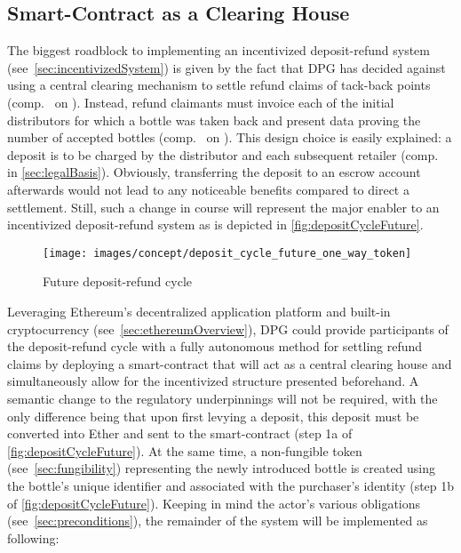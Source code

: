 \subsection{Smart-Contract as a Clearing House}
The biggest roadblock to implementing an incentivized deposit-refund system (see~\ref{sec:incentivizedSystem}) is given by the fact that \ac{DPG} has decided against using a central clearing mechanism to settle refund claims of tack-back points (comp.~ on ). Instead, refund claimants must invoice each of the initial distributors for which a bottle was taken back and present data proving the number of accepted bottles (comp.~ on ). This design choice is easily explained: a deposit is to be charged by the distributor and each subsequent retailer (comp.~ in \ref{sec:legalBasis}). Obviously, transferring the deposit to an escrow account afterwards would not lead to any noticeable benefits compared to direct a settlement. Still, such a change in course will represent the major enabler to an incentivized deposit-refund system as is depicted in \autoref{fig:depositCycleFuture}.

\begin{figure}[hbt]
	  \texttt{[image: images/concept/deposit\_cycle\_future\_one\_way\_token]}
	  \caption[Future deposit-refund cycle]{Future deposit-refund cycle \footnotemark}
	  \label{fig:depositCycleFuture}
\end{figure}


\FloatBarrier

Leveraging Ethereum's decentralized application platform and built-in cryptocurrency (see~\ref{sec:ethereumOverview}), \ac{DPG} could provide participants of the deposit-refund cycle with a fully autonomous method for settling refund claims by deploying a smart-contract that will act as a central clearing house and simultaneously allow for the incentivized structure presented beforehand. A semantic change to the regulatory underpinnings will not be required, with the only difference being that upon first levying a deposit, this deposit must be converted into Ether and sent to the smart-contract (step 1a of \autoref{fig:depositCycleFuture}). At the same time, a non-fungible token (see~\ref{sec:fungibility}) representing the newly introduced bottle is created using the bottle's unique identifier and associated with the purchaser's identity (step 1b of \autoref{fig:depositCycleFuture}). Keeping in mind the actor's various obligations (see~\ref{sec:preconditions}), the remainder of the system will be implemented as following: 

